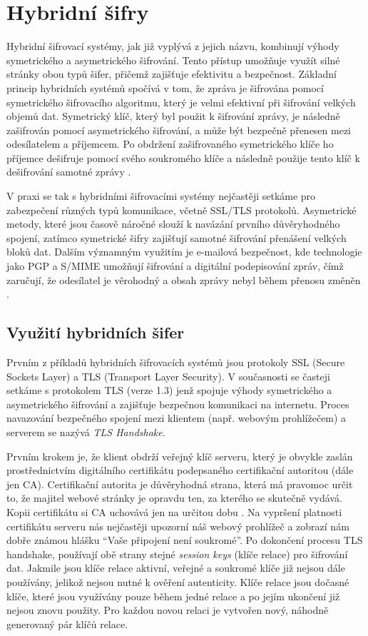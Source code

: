 \section{Hybridní šifry}
\label{sec:hybridni-sifra}

Hybridní šifrovací systémy, jak již vyplývá z jejich názvu, kombinují výhody symetrického a asymetrického šifrování. Tento přístup umožňuje využít silné stránky obou typů šifer, přičemž zajišťuje efektivitu a bezpečnost.
Základní princip hybridních systémů spočívá v tom, že zpráva je šifrována pomocí symetrického šifrovacího algoritmu, který je velmi efektivní při šifrování velkých objemů dat. Symetrický klíč, který byl použit k šifrování zprávy, je následně zašifrován pomocí asymetrického šifrování, a může být bezpečně přenesen mezi odesílatelem a příjemcem. Po obdržení zašifrovaného symetrického klíče ho příjemce dešifruje pomocí svého soukromého klíče a následně použije tento klíč k dešifrování samotné zprávy \parencite{pavlicek2012}.

V praxi se tak s hybridními šifrovacími systémy nejčastěji setkáme pro zabezpečení různých typů komunikace, včetně SSL/TLS protokolů. Asymetrické metody, které jsou časově náročné slouží k navázání prvního důvěryhodného spojení, zatímco symetrické šifry zajišťují samotné šifrování přenášení velkých bloků dat. Dalším významným využitím je e-mailová bezpečnost, kde technologie jako PGP a S/MIME umožňují šifrování a digitální podepisování zpráv, čímž zaručují, že odesílatel je věrohodný a obsah zprávy nebyl během přenosu změněn \parencite{sedlak2021}.

\subsection{Využití hybridních šifer}

Prvním z příkladů hybridních šifrovacích systémů jsou protokoly SSL (Secure Sockets Layer) a TLS (Transport Layer Security). V současnosti se časteji setkáme s protokolem TLS (verze 1.3) jenž spojuje výhody symetrického a asymetrického šifrování a zajišťuje bezpečnou komunikaci na internetu. Proces navazování bezpečného spojení mezi klientem (např. webovým prohlížečem) a serverem se nazývá \emph{TLS Handshake}. 

Prvním krokem je, že klient obdrží veřejný klíč serveru, který je obvykle zaslán prostřednictvím digitálního certifikátu podepsaného certifikační autoritou (dále jen CA). Certifikační autorita je důvěryhodná strana, která má pravomoc určit to, že majitel webové stránky je opravdu ten, za kterého se skutečně vydává. Kopii certifikátu si CA uchovává jen na určitou dobu \parencite{cloudflare2024}. Na vypršení platnosti certifikátu serveru nás nejčastěji upozorní náš webový prohlížeč a zobrazí nám dobře známou hlášku \enquote{Vaše připojení není soukromé}. 
Po dokončení procesu TLS handshake, používají obě strany stejné \emph{session keys} (klíče relace) pro šifrování dat. Jakmile jsou klíče relace aktivní, veřejné a soukromé klíče již nejsou dále používány, jelikož nejsou nutné k ověření autenticity. Klíče relace jsou dočasné klíče, které jsou využívány pouze během jedné relace a po jejím ukončení již nejsou znovu použity. Pro každou novou relaci je vytvořen nový, náhodně generovaný pár klíčů relace.

